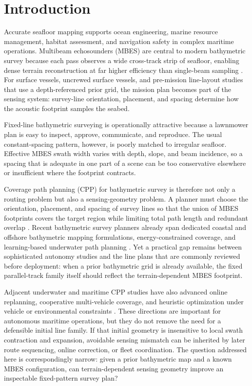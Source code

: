 \documentclass[jmse,article,submit,moreauthors]{Definitions/mdpi}
\begin{document}
\section{Introduction}
Accurate seafloor mapping supports ocean engineering, marine resource management, habitat assessment, and navigation safety in complex maritime operations. Multibeam echosounders (MBES) are central to modern bathymetric survey because each pass observes a wide cross-track strip of seafloor, enabling dense terrain reconstruction at far higher efficiency than single-beam sampling \cite{shi2020data,yordanova2020coverage}. For surface vessels, uncrewed surface vessels, and pre-mission line-layout studies that use a depth-referenced prior grid, the mission plan becomes part of the sensing system: survey-line orientation, placement, and spacing determine how the acoustic footprint samples the seabed.

Fixed-line bathymetric surveying is operationally attractive because a lawnmower plan is easy to inspect, approve, communicate, and reproduce. The usual constant-spacing pattern, however, is poorly matched to irregular seafloor. Effective MBES swath width varies with depth, slope, and beam incidence, so a spacing that is adequate in one part of a scene can be too conservative elsewhere or insufficient where the footprint contracts.

Coverage path planning (CPP) for bathymetric survey is therefore not only a routing problem but also a sensing-geometry problem. A planner must choose the orientation, placement, and spacing of survey lines so that the union of MBES footprints covers the target region while limiting total path length and redundant overlap \cite{li2024multi,zhang2022online,yan2024dual}. Recent bathymetric survey planners already span dedicated coastal and offshore bathymetric mapping formulations, energy-constrained coverage, and learning-based underwater path planning \cite{zhao2024coastalcpp,zhao2024jointcpp,yao2021coverage,dogru2022ecocpp,hadi2022drlcpp}. Yet a practical gap remains between sophisticated autonomy studies and the line plans that are commonly reviewed before deployment: when a prior bathymetric grid is already available, the fixed parallel-track family itself should reflect the terrain-dependent MBES footprint.

Adjacent underwater and maritime CPP studies have also advanced online replanning, cooperative multi-vehicle coverage, and heuristic optimization under vehicle or environmental constraints \cite{xie2024three,li2024full,ji2022multi,wu2024complete,zhang2023multi,mu2025coverage,zhu2019complete,han2023hybrid,kapetanovic2018side,tang2023coverage,cao2018real,zhang2021path}. These directions are important for autonomous maritime operations, but they do not remove the need for a defensible initial line family. If that initial geometry is insensitive to local swath contraction and expansion, avoidable sensing mismatch can be inherited by later route sequencing, online correction, or fleet coordination. The question addressed here is correspondingly narrow: given a prior bathymetric map and a known MBES configuration, can terrain-dependent sensing geometry improve an inspectable fixed-pattern survey plan?
\end{document}

